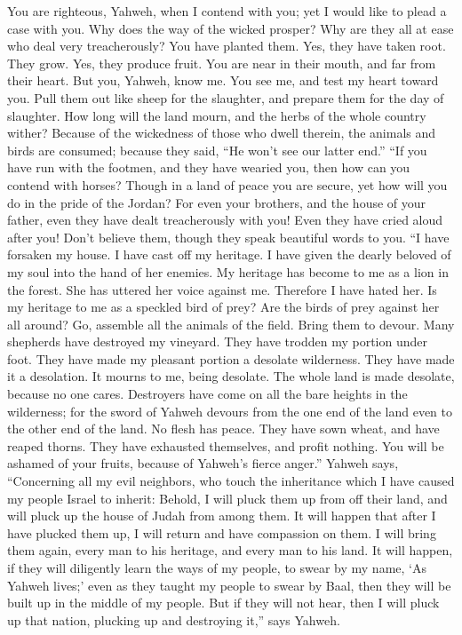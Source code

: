  You are righteous, Yahweh, when I contend with you; yet I
would like to plead a case with you. Why does the way of the wicked
prosper? Why are they all at ease who deal very treacherously?
 You have planted them. Yes, they have taken root. They
grow. Yes, they produce fruit. You are near in their mouth, and far from
their heart.  But you, Yahweh, know me. You see me, and
test my heart toward you. Pull them out like sheep for the slaughter,
and prepare them for the day of slaughter.  How long will
the land mourn, and the herbs of the whole country wither? Because of
the wickedness of those who dwell therein, the animals and birds are
consumed; because they said, ``He won't see our latter end.''
 ``If you have run with the footmen, and they have wearied
you, then how can you contend with horses? Though in a land of peace you
are secure, yet how will you do in the pride of the Jordan?
 For even your brothers, and the house of your father,
even they have dealt treacherously with you! Even they have cried aloud
after you! Don't believe them, though they speak beautiful words to you.
 ``I have forsaken my house. I have cast off my heritage.
I have given the dearly beloved of my soul into the hand of her enemies.
 My heritage has become to me as a lion in the forest. She
has uttered her voice against me. Therefore I have hated her.
 Is my heritage to me as a speckled bird of prey? Are the
birds of prey against her all around? Go, assemble all the animals of
the field. Bring them to devour.  Many shepherds have
destroyed my vineyard. They have trodden my portion under foot. They
have made my pleasant portion a desolate wilderness. 
They have made it a desolation. It mourns to me, being desolate. The
whole land is made desolate, because no one cares. 
Destroyers have come on all the bare heights in the wilderness; for the
sword of Yahweh devours from the one end of the land even to the other
end of the land. No flesh has peace.  They have sown
wheat, and have reaped thorns. They have exhausted themselves, and
profit nothing. You will be ashamed of your fruits, because of Yahweh's
fierce anger.''  Yahweh says, ``Concerning all my evil
neighbors, who touch the inheritance which I have caused my people
Israel to inherit: Behold, I will pluck them up from off their land, and
will pluck up the house of Judah from among them.  It
will happen that after I have plucked them up, I will return and have
compassion on them. I will bring them again, every man to his heritage,
and every man to his land.  It will happen, if they will
diligently learn the ways of my people, to swear by my name, `As Yahweh
lives;' even as they taught my people to swear by Baal, then they will
be built up in the middle of my people.  But if they will
not hear, then I will pluck up that nation, plucking up and destroying
it,'' says Yahweh.

